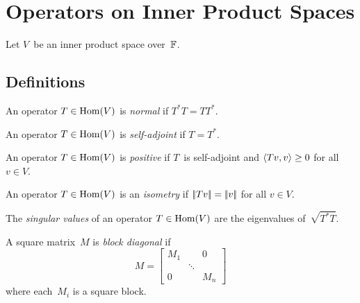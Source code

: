 %
%
%
\section{Operators on Inner Product Spaces}
Let \(V\)~be an inner product space over~\(\mathbb{F}\).
\subsection*{Definitions}
\begin{defn}
An operator \(T\in\operatorname{Hom}(V)\) is \emph{normal} if \(T^*T=TT^*\).
\end{defn}

\begin{defn}
An operator \(T\in\operatorname{Hom}(V)\) is \emph{self-adjoint} if \(T=T^*\).
\end{defn}

\begin{defn}
An operator \(T\in\operatorname{Hom}(V)\) is \emph{positive} if \(T\)~is self-adjoint and \(\langle{Tv},{v}\rangle\ge0\) for all \(v\in V\).
\end{defn}

\begin{defn}
An operator \(T\in\operatorname{Hom}(V)\) is an \emph{isometry} if \(\left|\!\left|{Tv}\right|\!\right|=\left|\!\left|{v}\right|\!\right|\) for all \(v\in V\).
\end{defn}

\begin{defn}
The \emph{singular values} of an operator \(T\in\operatorname{Hom}(V)\) are the eigenvalues of~\(\sqrt{T^*T}\).
\end{defn}

\begin{defn}
A square matrix~\(M\) is \emph{block diagonal} if
\[M=\left[\begin{matrix}
M_1&&0\\
&\ddots&\\
0&&M_n
\end{matrix}\right]\]
where each~\(M_i\) is a square block.
\end{defn}

